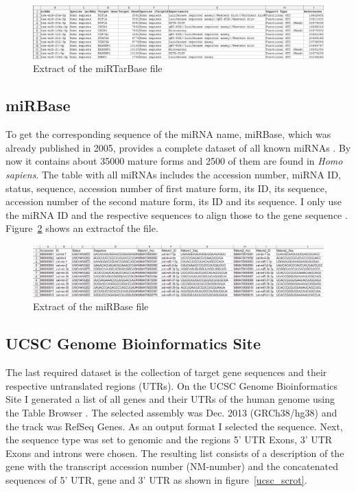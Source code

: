 \documentclass[11pt, a4paper, twoside]{book}
\begin{document}
\begin{figure}[h]
\centering
\includegraphics[width=\textwidth]{results/mirtarbase_scrot.png}
\caption{Extract of the miRTarBase file}
\label{mirtarbase_scrot}
\end{figure}
\vspace{0.5cm}


\subsection{miRBase}
To get the corresponding sequence of the miRNA name, miRBase, which was already published in 2005, provides a complete dataset of all known miRNAs \cite{Griffiths-Jones}. By now it contains about 35000 mature forms and 2500 of them are found in \textit{Homo sapiens}. The table with all miRNAs includes the accession number, miRNA ID, status, sequence, accession number of first mature form, its ID, its sequence, accession number of the second mature form, its ID and its sequence. I only use the miRNA ID and the respective sequences to align those to the gene sequence \cite{mirbase}. Figure~\ref{mirbase_scrot} shows an extractof the file.\\


\begin{figure}[h]
\centering
\includegraphics[width=\textwidth]{results/mirbase.png}
\caption{Extract of the miRBase file}
\label{mirbase_scrot}
\end{figure}


\vspace{0.5cm}

 
\subsection{UCSC Genome Bioinformatics Site}
The last required dataset is the collection of target gene sequences and their respective untranslated regions (UTRs). On the UCSC Genome Bioinformatics Site I generated a list of all genes and their UTRs of the human genome using the Table Browser \cite{ucsc}. The selected assembly was Dec. 2013 (GRCh38/hg38) and the track was RefSeq Genes. As an output format I selected the sequence. Next, the sequence type was set to genomic and the regions 5' UTR Exons, 3' UTR Exons and introns were chosen. The resulting list consists of a description of the gene with the transcript accession number (NM-number) and the concatenated sequences of 5' UTR, gene and 3' UTR as shown in figure~\ref{ucsc_scrot}.\\
\end{document}
